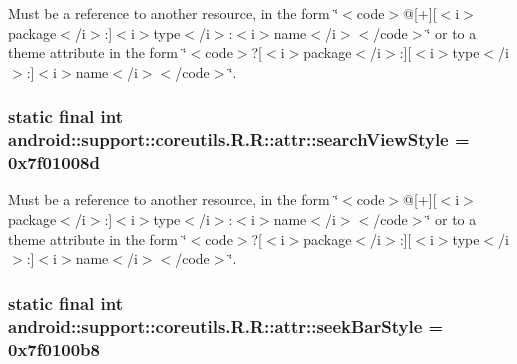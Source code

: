 Must be a reference to another resource, in the form \char`\"{}$<$code$>$@\mbox{[}+\mbox{]}\mbox{[}$<$i$>$package$<$/i$>$:\mbox{]}$<$i$>$type$<$/i$>$:$<$i$>$name$<$/i$>$$<$/code$>$\char`\"{} or to a theme attribute in the form \char`\"{}$<$code$>$?\mbox{[}$<$i$>$package$<$/i$>$:\mbox{]}\mbox{[}$<$i$>$type$<$/i$>$:\mbox{]}$<$i$>$name$<$/i$>$$<$/code$>$\char`\"{}. \hypertarget{classandroid_1_1support_1_1coreutils_1_1_r_1_1attr_f92200ea9a39925f5a1c4db383f03f96}{
\subsubsection[{searchViewStyle}]{\setlength{\rightskip}{0pt plus 5cm}static final int android::support::coreutils.R.R::attr::searchViewStyle = 0x7f01008d}}
\label{classandroid_1_1support_1_1coreutils_1_1_r_1_1attr_f92200ea9a39925f5a1c4db383f03f96}


Must be a reference to another resource, in the form \char`\"{}$<$code$>$@\mbox{[}+\mbox{]}\mbox{[}$<$i$>$package$<$/i$>$:\mbox{]}$<$i$>$type$<$/i$>$:$<$i$>$name$<$/i$>$$<$/code$>$\char`\"{} or to a theme attribute in the form \char`\"{}$<$code$>$?\mbox{[}$<$i$>$package$<$/i$>$:\mbox{]}\mbox{[}$<$i$>$type$<$/i$>$:\mbox{]}$<$i$>$name$<$/i$>$$<$/code$>$\char`\"{}. \hypertarget{classandroid_1_1support_1_1coreutils_1_1_r_1_1attr_439d31b4a050ada639b57016ce4dab58}{
\subsubsection[{seekBarStyle}]{\setlength{\rightskip}{0pt plus 5cm}static final int android::support::coreutils.R.R::attr::seekBarStyle = 0x7f0100b8}}
\label{classandroid_1_1support_1_1coreutils_1_1_r_1_1attr_439d31b4a050ada639b57016ce4dab58}


